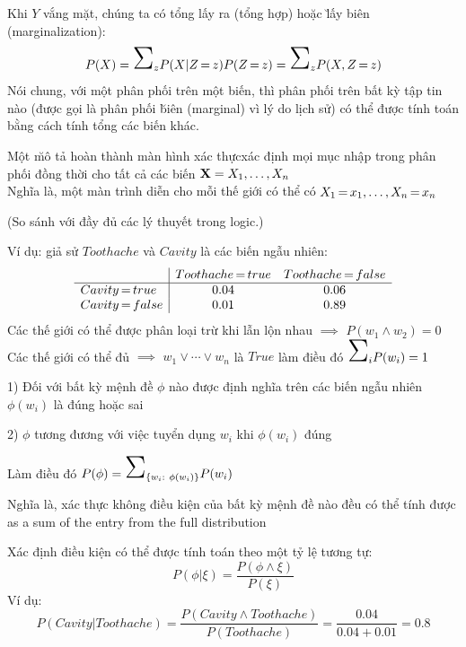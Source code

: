 \documentclass[fleqn]{article}
\begin{document}
\begin{huge}
Khi $Y$ vắng mặt, chúng ta có \u{ tổng lấy ra (tổng hợp)} hoặc \u{lấy biên (marginalization)}:
\[
  P(X) = \mysum_z P(X|Z\eq z) P(Z\eq z) = \mysum_z P(X,Z\eq z)
\]
Nói chung, với một phân phối trên một biến, thì
phân phối trên bất kỳ tập tin nào (được gọi là phân phối \u{biên (marginal)} vì
lý do lịch sử) có thể được tính toán bằng cách tính tổng các biến khác.



Một \u{mô tả hoàn thành màn hình xác thực}xác định mọi mục nhập trong phân phối
đồng thời cho tất cả các biến $\mbox{{\bf X}} = X_1,\ldots,X_n$\\
Nghĩa là, một màn trình diễn cho mỗi thế giới có thể có $X_1{\,{=}\,} x_1,\ldots,X_n{\,{=}\,} x_n$

(So sánh với đầy đủ các lý thuyết trong logic.)


Ví dụ: giả sử $Toothache$ và $Cavity$ là các biến ngẫu nhiên:
\[\begin{array}{l|cc}
 & Toothache{\,{=}\,} true & Toothache{\,{=}\,} false \\
\hline
Cavity {\,{=}\,} true  & 0.04 & 0.06 \\
Cavity {\,{=}\,} false & 0.01 & 0.89
\end{array}\]
Các thế giới có thể được phân loại trừ khi lẫn lộn nhau $\implies$ $P(w_1 \land w_2) = 0$\\
Các thế giới có thể đủ $\implies$ $w_1 \lor \cdots \lor w_n$ là $True$\nl
làm điều đó $\mysum_i P(w_i) = 1$




1) Đối với bất kỳ mệnh đề $\phi$ nào được định nghĩa trên các biến ngẫu nhiên\nl
   $\phi(w_i)$ là đúng hoặc sai

2) $\phi$ tương đương với việc tuyển dụng $w_i$ khi $\phi(w_i)$ đúng

Làm điều đó $P(\phi) = \mysum_{\{w_i:\ \phi(w_i)\}} P(w_i)$

Nghĩa là, xác thực không điều kiện của bất kỳ mệnh đề nào đều có thể tính được
as a sum of the entry from the full distribution

Xác định điều kiện có thể được tính toán theo một tỷ lệ tương tự:
\[
  P(\phi|\xi) = \frac{P(\phi\land \xi)}{P(\xi)}
\]
Ví dụ: 
\[
  P(Cavity |Toothache) 
   = \frac{P(Cavity \land Toothache)}{P(Toothache)}
   = \frac{0.04}{0.04+0.01} = 0.8
\]





\end{huge}
\end{document}
